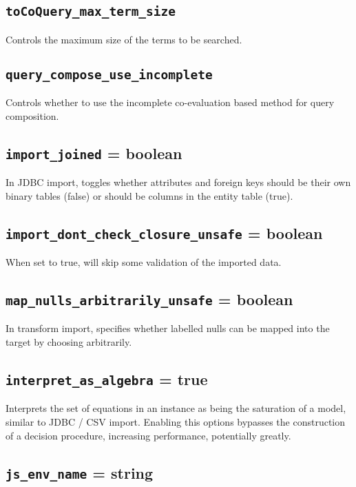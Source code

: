 \documentclass[10pt]{book}
\begin{document}
\subsection{{\tt toCoQuery\_max\_term\_size}}

Controls the maximum size of the terms to be searched. 

\subsection{{\tt query\_compose\_use\_incomplete}}

Controls whether to use the incomplete co-evaluation based method for query composition.

\subsection{{\tt import\_joined} = boolean} 

In JDBC import, toggles whether attributes and foreign keys should be their own binary tables (false) or should be columns in the entity table (true).

\subsection{{\tt import\_dont\_check\_closure\_unsafe} = boolean} 

When set to true, will skip some validation of the imported data.
		
\subsection{{\tt map\_nulls\_arbitrarily\_unsafe} = boolean}

In transform import, specifies whether labelled nulls can be mapped into the target by choosing arbitrarily.

\subsection{{\tt interpret\_as\_algebra} = true}

Interprets the set of equations in an instance as being the saturation of a model, similar to JDBC / CSV import.  Enabling this options bypasses the construction of a decision procedure, increasing performance, potentially greatly.

\subsection{{\tt js\_env\_name} = string}
\end{document}
